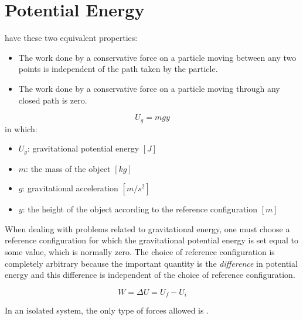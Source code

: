 \chapter{Potential Energy}
        \par {} have these two equivalent properties:
        \begin{itemize}
            \item The work done by a conservative force on a particle moving between any two
                points is independent of the path taken by the particle.
            \item The work done by a conservative force on a particle moving through any closed
                path is zero.
        \end{itemize}

        \begin{equation}
            U_{g} = mgy
        \end{equation}
        in which:
        \begin{itemize}
            \item $U_{g}$: gravitational potential energy $[J]$
            \item $m$: the mass of the object $[kg]$
            \item $g$: gravitational acceleration $[m/s^{2}]$
            \item $y$: the height of the object according to the reference configuration $[m]$
        \end{itemize}
        \par {} When dealing with problems related to gravitational energy, one
        must choose a reference configuration for which the gravitational potential energy
        is set equal to some value, which is normally zero. The choice of reference configuration
        is completely arbitrary because the important quantity is the \textit{difference} in
        potential energy and this difference is independent of the choice of reference configuration.

        \begin{equation}
            W = \Delta U = U_{f} - U_{i}
        \end{equation}

        \par In an isolated system, the only type of forces allowed is .

